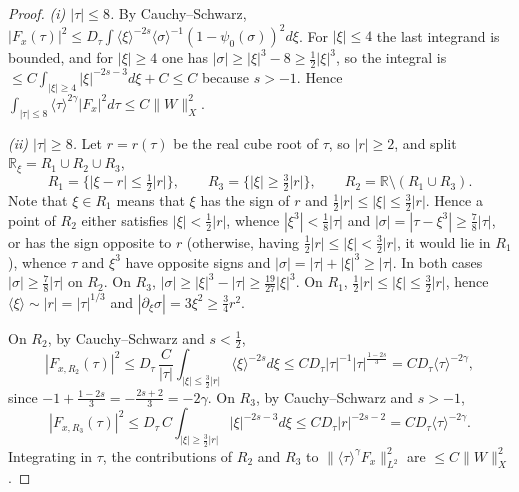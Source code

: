 \documentclass[10pt,reqno]{amsart}
\theoremstyle{remark}
\numberwithin{equation}{section}
\newcommand{\R}{\mathbb R}
\newcommand{\pd}{\partial}
\newcommand{\ga}{\gamma}
\newcommand{\lan}{\langle}
\newcommand{\ran}{\rangle}
\newcommand{\sig}{\sigma}
\begin{document}
\begin{proof}
\emph{(i) $|\tau|\le8$.} By Cauchy--Schwarz, $|F_x(\tau)|^2\le D_\tau\int\lan\xi\ran^{-2s}\lan\sig\ran^{-1}(1-\psi_0(\sig))^2d\xi$. For $|\xi|\le4$ the last integrand is bounded, and for $|\xi|\ge4$ one has $|\sig|\ge|\xi|^3-8\ge\frac12|\xi|^3$, so the integral is $\le C\int_{|\xi|\ge4}|\xi|^{-2s-3}d\xi+C\le C$ because $s>-1$. Hence $\int_{|\tau|\le8}\lan\tau\ran^{2\ga}|F_x|^2d\tau\le C\|W\|_X^2$.

\emph{(ii) $|\tau|\ge8$.} Let $r=r(\tau)$ be the real cube root of $\tau$, so $|r|\ge2$, and split $\R_\xi=R_1\cup R_2\cup R_3$,
$$R_1=\{|\xi-r|\le\tfrac12|r|\},\qquad R_3=\{|\xi|\ge\tfrac32|r|\},\qquad R_2=\R\setminus(R_1\cup R_3).$$
Note that $\xi\in R_1$ means that $\xi$ has the sign of $r$ and $\frac12|r|\le|\xi|\le\frac32|r|$. Hence a point of $R_2$ either satisfies $|\xi|<\frac12|r|$, whence $|\xi^3|<\frac18|\tau|$ and $|\sig|=|\tau-\xi^3|\ge\frac78|\tau|$, or has the sign opposite to $r$ (otherwise, having $\frac12|r|\le|\xi|<\frac32|r|$, it would lie in $R_1$), whence $\tau$ and $\xi^3$ have opposite signs and $|\sig|=|\tau|+|\xi|^3\ge|\tau|$. In both cases $|\sig|\ge\frac78|\tau|$ on $R_2$. On $R_3$, $|\sig|\ge|\xi|^3-|\tau|\ge\frac{19}{27}|\xi|^3$. On $R_1$, $\frac12|r|\le|\xi|\le\frac32|r|$, hence $\lan\xi\ran\sim|r|=|\tau|^{1/3}$ and $|\pd_\xi\sig|=3\xi^2\ge\frac34r^2$.

On $R_2$, by Cauchy--Schwarz and $s<\frac12$,
$$|F_{x,R_2}(\tau)|^2\le D_\tau\,\frac{C}{|\tau|}\int_{|\xi|\le\frac32|r|}\lan\xi\ran^{-2s}d\xi\le C D_\tau|\tau|^{-1}|\tau|^{\frac{1-2s}3}=CD_\tau\lan\tau\ran^{-2\ga},$$
since $-1+\frac{1-2s}3=-\frac{2s+2}3=-2\ga$. On $R_3$, by Cauchy--Schwarz and $s>-1$,
$$|F_{x,R_3}(\tau)|^2\le D_\tau\, C\int_{|\xi|\ge\frac32|r|}|\xi|^{-2s-3}d\xi\le CD_\tau|r|^{-2s-2}=CD_\tau\lan\tau\ran^{-2\ga}.$$
Integrating in $\tau$, the contributions of $R_2$ and $R_3$ to $\|\lan\tau\ran^\ga F_x\|_{L^2}^2$ are $\le C\|W\|_X^2$.


\end{proof}
\end{document}
